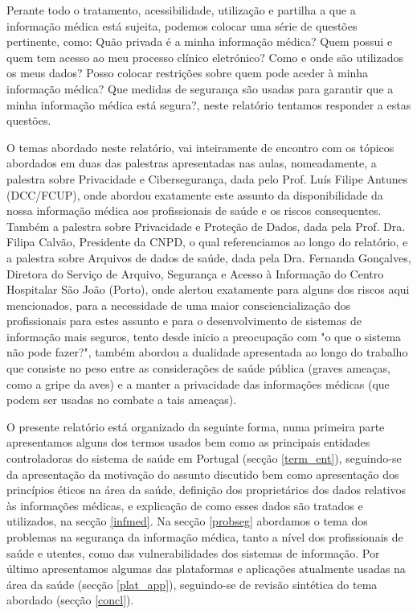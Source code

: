 \documentclass[conference]{IEEEtran}
\begin{document}
Perante todo o tratamento, acessibilidade, utilização e partilha a que a informação médica está sujeita, podemos colocar uma série de questões pertinente, como: Quão privada é a minha informação médica? Quem possui e quem tem acesso ao meu processo clínico eletrónico? Como e onde são utilizados os meus dados? Posso colocar restrições sobre quem pode aceder à minha informação médica? Que medidas de segurança são usadas para garantir que a minha informação médica está segura?, neste relatório tentamos responder a estas questões.

O temas abordado neste relatório, vai inteiramente de encontro com os tópicos abordados em duas das palestras apresentadas nas aulas, nomeadamente, a palestra sobre Privacidade e Cibersegurança, dada pelo Prof. Luís Filipe Antunes (DCC/FCUP), onde abordou exatamente este assunto da disponibilidade da nossa informação médica aos profissionais de saúde e os riscos consequentes. Também a palestra sobre Privacidade e Proteção de Dados, dada pela Prof. Dra. Filipa Calvão, Presidente da CNPD, o qual referenciamos ao longo do relatório, e a palestra sobre Arquivos de dados de saúde, dada pela Dra. Fernanda Gonçalves, Diretora do Serviço de Arquivo, Segurança e Acesso à Informação do Centro Hospitalar São João (Porto), onde alertou exatamente para alguns dos riscos aqui mencionados, para a necessidade de uma maior consciencialização dos profissionais para estes assunto e para o desenvolvimento de sistemas de informação mais seguros, tento desde inicio a preocupação com "o que o sistema não pode fazer?", também abordou a dualidade apresentada ao longo do trabalho que consiste no peso entre as considerações de saúde pública (graves ameaças, como a gripe da aves) e a manter a privacidade das informações médicas (que podem ser usadas no combate a tais ameaças).

O presente relatório está organizado da seguinte forma, numa primeira parte apresentamos alguns dos termos usados bem como as principais entidades controladoras do sistema de saúde em Portugal (secção \ref{term_ent}), seguindo-se da apresentação da motivação do assunto discutido bem como apresentação dos princípios éticos na área da saúde, definição dos proprietários dos dados relativos às informações médicas, e explicação de como esses dados são tratados e utilizados, na secção \ref{infmed}. Na secção \ref{probseg} abordamos o tema dos problemas na segurança da informação médica, tanto a nível dos profissionais de saúde e utentes, como das vulnerabilidades dos sistemas de informação. Por último apresentamos algumas das plataformas e aplicações atualmente usadas na área da saúde (secção \ref{plat_app}), seguindo-se de revisão sintética do tema abordado (secção \ref{concl}).
\end{document}
